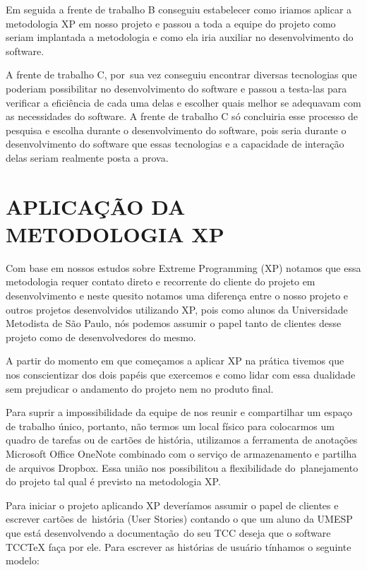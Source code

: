 Em seguida a frente de trabalho B conseguiu estabelecer como iriamos aplicar a metodologia XP em nosso projeto e passou
a toda a equipe do projeto como seriam implantada a metodologia e como ela iria auxiliar no desenvolvimento do
software.\ 


A frente de trabalho C, por\ sua vez conseguiu encontrar diversas tecnologias que poderiam possibilitar no
desenvolvimento do software e passou a testa-las para verificar a efici\^encia de cada uma delas e escolher quais
melhor se adequavam com as necessidades do software. A frente de trabalho C s\'o concluiria esse processo de pesquisa e
escolha durante o desenvolvimento do software, pois seria durante o desenvolvimento do software que essas tecnologias e
a capacidade de intera\c{c}\~ao delas seriam realmente posta a prova.


\bigskip

\section{APLICA\c{C}\~AO DA METODOLOGIA XP}

\bigskip

Com base em nossos estudos sobre Extreme Programming (XP) notamos que essa metodologia requer contato direto e
recorrente do cliente do projeto em desenvolvimento e neste quesito notamos uma diferen\c{c}a entre o nosso projeto e
outros projetos desenvolvidos utilizando XP, pois como alunos da Universidade Metodista de S\~ao Paulo, n\'os podemos
assumir o papel tanto de clientes desse projeto como de desenvolvedores do mesmo.


A partir do momento em que come\c{c}amos a aplicar XP na pr\'atica tivemos que nos conscientizar dos dois pap\'eis que
exercemos e como lidar com essa dualidade sem prejudicar o andamento do projeto nem no produto final.


Para suprir a impossibilidade da equipe de nos reunir e compartilhar um espa\c{c}o de trabalho \'unico, portanto, n\~ao
termos um local f\'isico para colocarmos um quadro de tarefas ou de cart\~oes de hist\'oria, utilizamos a ferramenta de
anota\c{c}\~oes Microsoft Office OneNote combinado com o servi\c{c}o de armazenamento e partilha de arquivos Dropbox.
Essa uni\~ao nos possibilitou a flexibilidade do\ planejamento do projeto tal qual \'e previsto na metodologia XP.\ 

Para iniciar o projeto aplicando XP dever\'iamos assumir o papel de clientes e escrever cart\~oes de\ hist\'oria (User
Stories) contando o que um aluno da UMESP que est\'a desenvolvendo a documenta\c{c}\~ao\ do seu TCC deseja que o
software TCCTeX fa\c{c}a por ele. Para escrever as hist\'orias de usu\'ario t\'inhamos o seguinte modelo:


